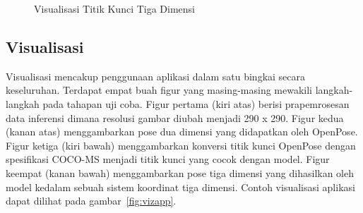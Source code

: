 \begin{figure}[htbp]
    \begin{center}
    \end{center}
    \vspace{-20pt}
    \captionsetup{labelfont=bf, textfont=bf}
    \caption{Visualisasi Titik Kunci Tiga Dimensi}
    \vspace{-10pt}
    \captionsetup{labelfont=md, textfont=md}
    \label{fig:bro118}
\end{figure}


\subsection{Visualisasi}

Visualisasi mencakup penggunaan aplikasi dalam satu bingkai secara keseluruhan. Terdapat empat buah
figur yang masing-masing mewakili langkah-langkah pada tahapan uji coba. Figur pertama (kiri atas)
berisi prapemrosesan data inferensi dimana resolusi gambar diubah menjadi 290 x 290. Figur kedua
(kanan atas) menggambarkan pose dua dimensi yang didapatkan oleh OpenPose. Figur ketiga (kiri bawah)
menggambarkan konversi titik kunci OpenPose dengan spesifikasi COCO-MS menjadi titik kunci yang cocok
dengan model. Figur keempat (kanan bawah) menggambarkan pose tiga dimensi yang dihasilkan oleh model
kedalam sebuah sistem koordinat tiga dimensi. Contoh visualisasi aplikasi dapat dilihat pada
gambar~\ref{fig:vizapp}.

